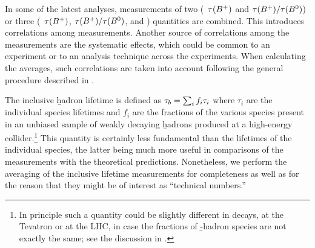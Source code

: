 In some of the latest analyses, measurements of two (\eg\ $\tau(B^+)$ and
$\tau(B^+)/\tau(B^0)$) or three (\eg\ $\tau(B^+)$,
$\tau(B^+)/\tau(B^0)$, and \dmd) quantities are combined.  This
introduces correlations among measurements.  Another source of
correlations among the measurements are the systematic effects, which
could be common to an experiment or to an analysis technique across the
experiments.  When calculating the averages, such correlations are taken
into account following the general procedure described in
.



The inclusive \b hadron lifetime is defined as $\tau_{b} = \sum_i f_i
\tau_i$ where $\tau_i$ are the individual species lifetimes and $f_i$ are
the fractions of the various species present in an unbiased sample of
weakly decaying \b hadrons produced at a high-energy
collider.\footnote{In principle such a quantity could be slightly
different in  decays, at the Tevatron or at the LHC, 
in case the
fractions of \b-hadron species are not exactly the same; see the
discussion in .}  This quantity is certainly
less fundamental than the lifetimes of the individual species, the
latter being much more useful in comparisons of the measurements with
the theoretical predictions.  Nonetheless, we perform the averaging of
the inclusive lifetime measurements for completeness as well as for the
reason that they might be of interest as ``technical numbers.''

